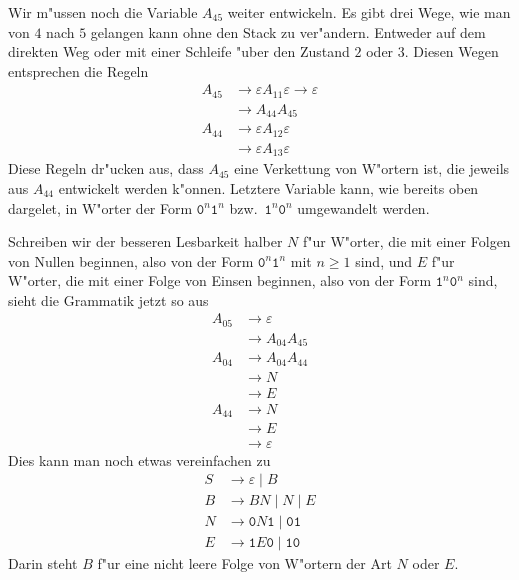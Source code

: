 \begin{loesung}
Wir m"ussen noch die Variable $A_{45}$ weiter entwickeln. Es gibt
drei Wege, wie man von $4$ nach $5$ gelangen kann ohne den
Stack zu ver"andern. Entweder auf dem direkten Weg oder mit
einer Schleife "uber den Zustand $2$ oder $3$.
Diesen Wegen entsprechen die Regeln
\begin{align*}
A_{45}&\to\varepsilon A_{11}\varepsilon\to\varepsilon\\
      &\to A_{44}A_{45}\\
A_{44}&\to\varepsilon A_{12}\varepsilon\\
      &\to\varepsilon A_{13}\varepsilon
\end{align*}
Diese Regeln dr"ucken aus, dass $A_{45}$ eine Verkettung von W"ortern
ist, die jeweils aus $A_{44}$ entwickelt werden k"onnen.
Letztere Variable kann, wie bereits oben dargelet,
in W"orter der Form $\texttt{0}^n\texttt{1}^n$ bzw.~$\texttt{1}^n\texttt{0}^n$
umgewandelt werden.

Schreiben wir der besseren Lesbarkeit halber $N$ f"ur W"orter, die mit
einer Folgen von Nullen beginnen, also von der
Form $\texttt{0}^n\texttt{1}^n$ mit $n\ge 1$ sind, und $E$ f"ur W"orter,
die mit einer Folge von Einsen beginnen, also von der
Form $\texttt{1}^n\texttt{0}^n$ sind, sieht die Grammatik jetzt so aus
\begin{align*}
A_{05}&\to\varepsilon \\
      &\to A_{04}A_{45} \\
A_{04}&\to A_{04}A_{44} \\
      &\to N \\
      &\to E \\
A_{44}&\to N \\
      &\to E \\
      &\to \varepsilon
\end{align*}
Dies kann man noch etwas vereinfachen zu
\begin{align*}
S&\to \varepsilon\;|\; B\\
B&\to BN\;|\;N\;|\;E\\
N&\to \texttt{0}N\texttt{1}\;|\; \texttt{01}\\
E&\to \texttt{1}E\texttt{0}\;|\; \texttt{10}
\end{align*}
Darin steht $B$ f"ur eine nicht leere Folge von W"ortern der Art $N$
oder $E$.
\end{loesung}


